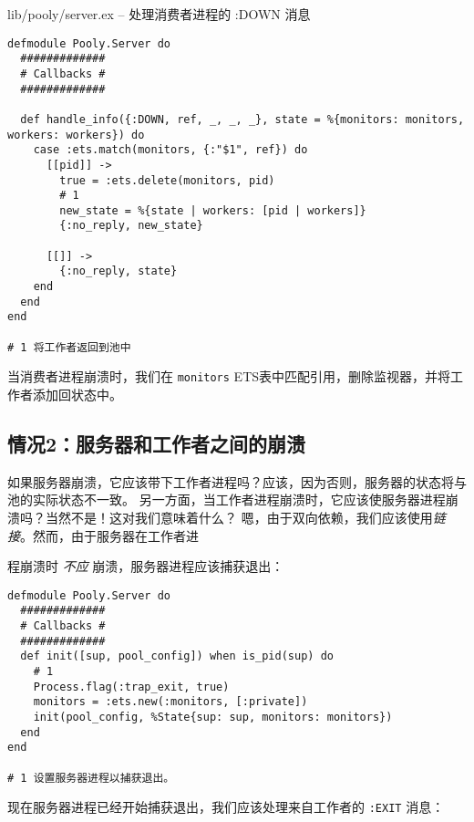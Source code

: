 \begin{code}{lib/pooly/server.ex – 处理消费者进程的 :DOWN 消息}

\begin{verbatim}
defmodule Pooly.Server do
  #############
  # Callbacks #
  #############

  def handle_info({:DOWN, ref, _, _, _}, state = %{monitors: monitors, workers: workers}) do
    case :ets.match(monitors, {:"$1", ref}) do
      [[pid]] ->
        true = :ets.delete(monitors, pid)
        # 1
        new_state = %{state | workers: [pid | workers]}
        {:no_reply, new_state}

      [[]] ->
        {:no_reply, state}
    end
  end
end

# 1 将工作者返回到池中
\end{verbatim}
\label{lst:worker-pool-handle-info}
\end{code}

当消费者进程崩溃时，我们在 \texttt{monitors} ETS表中匹配引用，删除监视器，并将工作者添加回状态中。


\subsection{情况2：服务器和工作者之间的崩溃}

如果服务器崩溃，它应该带下工作者进程吗？应该，因为否则，服务器的状态将与池的实际状态不一致。
另一方面，当工作者进程崩溃时，它应该使服务器进程崩溃吗？当然不是！这对我们意味着什么？
嗯，由于双向依赖，我们应该使用\emph{链接}。然而，由于服务器在工作者进

程崩溃时 \emph{不应} 崩溃，服务器进程应该捕获退出：

\begin{code}{}
\begin{verbatim}
defmodule Pooly.Server do
  #############
  # Callbacks #
  #############
  def init([sup, pool_config]) when is_pid(sup) do
    # 1
    Process.flag(:trap_exit, true)
    monitors = :ets.new(:monitors, [:private])
    init(pool_config, %State{sup: sup, monitors: monitors})
  end
end

# 1 设置服务器进程以捕获退出。
\end{verbatim}
\end{code}

现在服务器进程已经开始捕获退出，我们应该处理来自工作者的
\texttt{:EXIT} 消息：

